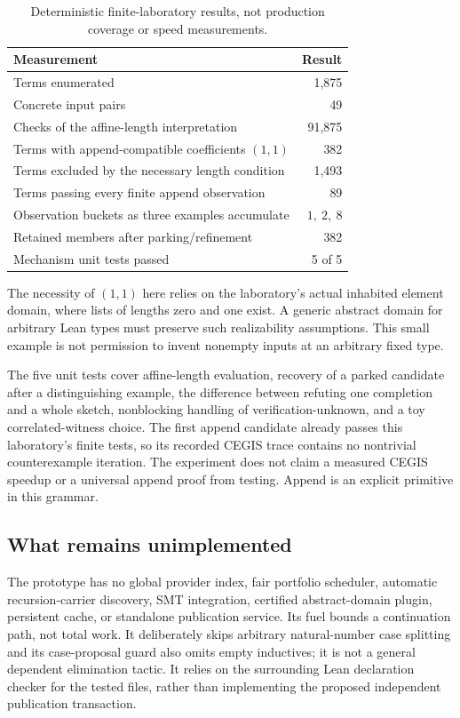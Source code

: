 \begin{table}[ht]
\centering
\begin{tabularx}{0.88\textwidth}{@{}Yr@{}}
\toprule
Measurement & Result \\
\midrule
Terms enumerated & 1,875 \\
Concrete input pairs & 49 \\
Checks of the affine-length interpretation & 91,875 \\
Terms with append-compatible coefficients $(1,1)$ & 382 \\
Terms excluded by the necessary length condition & 1,493 \\
Terms passing every finite append observation & 89 \\
Observation buckets as three examples accumulate & $1,\ 2,\ 8$ \\
Retained members after parking/refinement & 382 \\
Mechanism unit tests passed & 5 of 5 \\
\bottomrule
\end{tabularx}
\caption{Deterministic finite-laboratory results, not production coverage or speed measurements.}
\end{table}

The necessity of $(1,1)$ here relies on the laboratory's actual inhabited element domain, where lists of lengths zero and one exist. A generic abstract domain for arbitrary Lean types must preserve such realizability assumptions. This small example is not permission to invent nonempty inputs at an arbitrary fixed type.

The five unit tests cover affine-length evaluation, recovery of a parked candidate after a distinguishing example, the difference between refuting one completion and a whole sketch, nonblocking handling of verification-unknown, and a toy correlated-witness choice. The first append candidate already passes this laboratory's finite tests, so its recorded CEGIS trace contains no nontrivial counterexample iteration. The experiment does not claim a measured CEGIS speedup or a universal append proof from testing. Append is an explicit primitive in this grammar.

\subsection{What remains unimplemented}
The prototype has no global provider index, fair portfolio scheduler, automatic recursion-carrier discovery, SMT integration, certified abstract-domain plugin, persistent cache, or standalone publication service. Its fuel bounds a continuation path, not total work. It deliberately skips arbitrary natural-number case splitting and its case-proposal guard also omits empty inductives; it is not a general dependent elimination tactic. It relies on the surrounding Lean declaration checker for the tested files, rather than implementing the proposed independent publication transaction.

